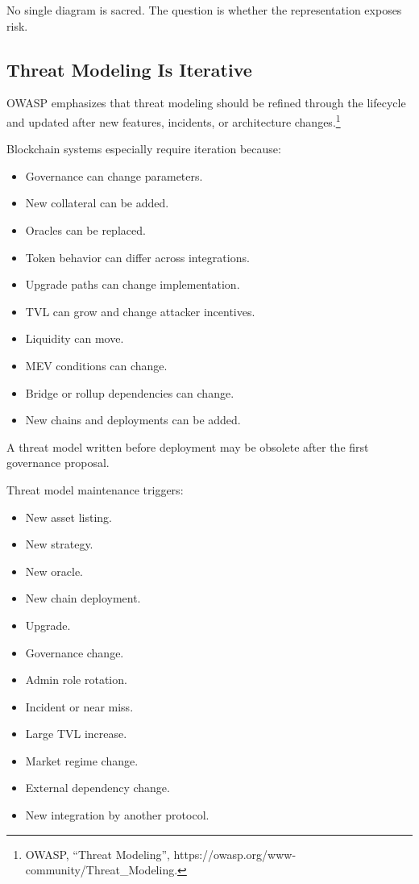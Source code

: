 No single diagram is sacred. The question is whether the representation
exposes risk.

\subsection{Threat Modeling Is Iterative}

OWASP emphasizes that threat modeling should be refined through the
lifecycle and updated after new features, incidents, or architecture
changes.\footnote{OWASP, ``Threat Modeling'',
  https://owasp.org/www-community/Threat\_Modeling.}

Blockchain systems especially require iteration because:

\begin{itemize}
\tightlist
\item
  Governance can change parameters.
\item
  New collateral can be added.
\item
  Oracles can be replaced.
\item
  Token behavior can differ across integrations.
\item
  Upgrade paths can change implementation.
\item
  TVL can grow and change attacker incentives.
\item
  Liquidity can move.
\item
  MEV conditions can change.
\item
  Bridge or rollup dependencies can change.
\item
  New chains and deployments can be added.
\end{itemize}

A threat model written before deployment may be obsolete after the first
governance proposal.

Threat model maintenance triggers:

\begin{itemize}
\tightlist
\item
  New asset listing.
\item
  New strategy.
\item
  New oracle.
\item
  New chain deployment.
\item
  Upgrade.
\item
  Governance change.
\item
  Admin role rotation.
\item
  Incident or near miss.
\item
  Large TVL increase.
\item
  Market regime change.
\item
  External dependency change.
\item
  New integration by another protocol.
\end{itemize}

